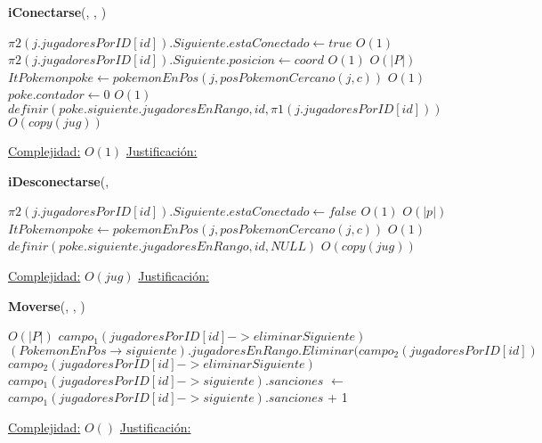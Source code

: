 \begin{algorithm}[H]{\textbf{iConectarse}(, , )}
	\begin{algorithmic}
		\State $\pi 2(j.jugadoresPorID[id]).Siguiente.estaConectado \gets true $ \Comment $O(1)$
		\State $\pi 2(j.jugadoresPorID[id]).Siguiente.posicion \gets coord $ \Comment $O(1)$
		 \Comment $O(|P|)$
			\State $ItPokemon poke \gets pokemonEnPos(j,posPokemonCercano(j,c))$ \Comment $O(1)$
			\State $poke.contador \gets 0$ \Comment $O(1)$
			\State $ definir(poke.siguiente.jugadoresEnRango,id,\pi 1(j.jugadoresPorID[id])) $ \Comment $O(copy(jug))$
		\EndIf
	
		\medskip
		\Statex \underline{Complejidad:} $O(1)$
		\Statex \underline{Justificación:}  
    \end{algorithmic}
\end{algorithm}

\begin{algorithm}[H]{\textbf{iDesconectarse}(, } 
	\begin{algorithmic}
		\State $\pi 2(j.jugadoresPorID[id]).Siguiente.estaConectado \gets false $ \Comment $O(1)$
		 \Comment $O(|p|)$
			\State $ItPokemon poke \gets pokemonEnPos(j,posPokemonCercano(j,c))$ \Comment $O(1)$
			\State $definir(poke.siguiente.jugadoresEnRango,id,NULL) $ \Comment $O(copy(jug))$
		\EndIf
	
		\medskip
		\Statex \underline{Complejidad:} $O(jug)$
		\Statex \underline{Justificación:}  
    \end{algorithmic}
\end{algorithm}

\begin{algorithm}[H]{\textbf{Moverse}(, , )}{}
	\begin{algorithmic}
	 \Comment $O(|P|)$
			\State $campo_1(jugadoresPorID[id]->eliminarSiguiente)$
				\State $(PokemonEnPos \rightarrow siguiente).jugadoresEnRango.Eliminar(campo_2(jugadoresPorID[id])$
				\State $campo_2(jugadoresPorID[id]->eliminarSiguiente)$
			\Else
				\State $campo_1(jugadoresPorID[id]->siguiente).sanciones$ $\gets$ $campo_1(jugadoresPorID[id]->siguiente).sanciones$ + 1
			\EndIf
		\EndIf
	\EndIf

\medskip
\Statex \underline{Complejidad:} $O()$
\Statex \underline{Justificación:}
\end{algorithmic}
\end{algorithm}

